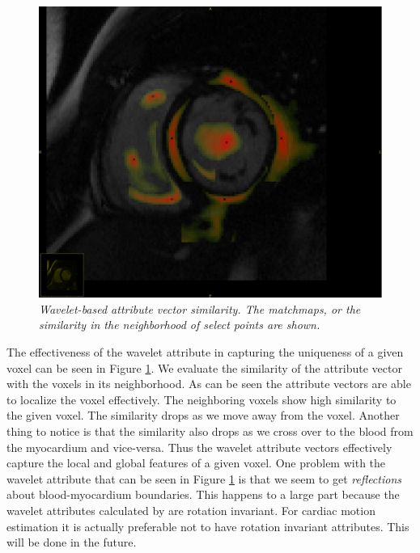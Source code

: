 \begin{figure}
\begin{center}
\includegraphics[scale=0.25]{images/wav_local.png} 
\caption{\em \small Wavelet-based attribute vector similarity. The matchmaps, or the similarity in the neighborhood of select points are shown.}
\label{wav-sim}
\end{center}  
\end{figure} 

The effectiveness of the wavelet attribute in capturing the uniqueness of a given voxel can be seen in Figure \ref{wav-sim}. We evaluate the similarity of the attribute vector with the voxels in its neighborhood. As can be seen the attribute vectors are able to localize the voxel effectively. The neighboring voxels show high similarity to the given voxel. The similarity drops as we move away from the voxel. Another thing to notice is that the similarity also drops as we cross over to the blood from the myocardium and vice-versa. Thus the wavelet attribute vectors effectively capture the local and global features of a given voxel. One problem with the wavelet attribute that can be seen in Figure \ref{wav-sim} is that we seem to get \textit{reflections} about blood-myocardium boundaries. This happens to a large part because the wavelet attributes calculated by \cite{wav} are rotation invariant. For cardiac motion estimation it is actually preferable not to have rotation invariant attributes. This will be done in the future.


